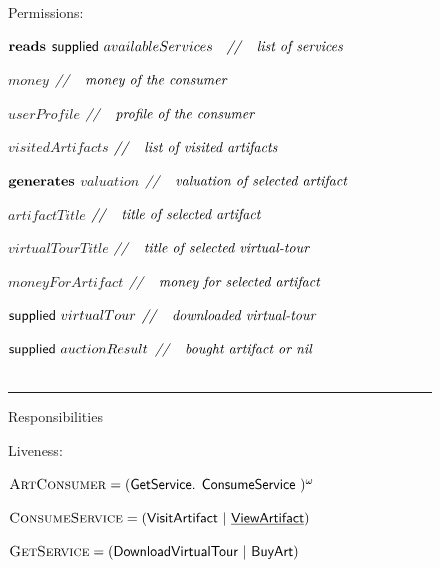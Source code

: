 \documentclass[paper=letter, fontsize=12pt]{article}
\begin{document}
\begin{figure}[H]
\begin{center}
{{\setlength\parindent{14pt} Permissions: 
\par\setlength\parindent{104pt}$\text{\textbf{reads}}$ \hspace{2.8em} $\text{{\fontfamily{\sfdefault}\selectfont supplied }}availableServices \quad \text{\textit{//}} \quad \text{\textit{list of services}}$
\par\setlength\parindent{162pt}$money$\hspace{8.9em} $\text{\textit{//}} \quad \text{\textit{money of the consumer}}$
\par\setlength\parindent{162pt}$userProfile$\hspace{6.6em} $\text{\textit{//}} \quad \text{\textit{profile of the consumer}}$
\par\setlength\parindent{162pt}$visitedArtifacts$\hspace{4.5em} $\text{\textit{//}} \quad \text{\textit{list of visited artifacts}}$
\par\setlength\parindent{104pt}$\text{\textbf{generates}}$ \hspace{0.9em} $valuation$\hspace{7.5em} $\text{\textit{//}} \quad \text{\textit{valuation of selected artifact}}$
\par\setlength\parindent{162pt}$artifactTitle$\hspace{6.1em} $\text{\textit{//}} \quad \text{\textit{title of selected artifact}}$\
\par\setlength\parindent{162pt}$virtualTourTitle$\hspace{4.4em} $\text{\textit{//}} \quad \text{\textit{title of selected virtual-tour}}$\
\par\setlength\parindent{162pt}$moneyForArtifact$\hspace{3.4em} $\text{\textit{//}} \quad \text{\textit{money for selected artifact}}$
\par\setlength\parindent{162pt}$\text{{\fontfamily{\sfdefault}\selectfont supplied }}virtualTour$\hspace{2.5em} $\text{\textit{//}} \quad \text{\textit{downloaded virtual-tour}}$
\par\setlength\parindent{162pt}$\text{{\fontfamily{\sfdefault}\selectfont supplied }}auctionResult$\hspace{1.4em} $\text{\textit{//}} \quad \text{\textit{bought artifact or nil}}$
\\
\\
\setlength\parindent{14pt} \noindent\rule{15cm}{0.4pt}

\setlength\parindent{14pt} Responsibilities
\par \setlength\parindent{14pt} Liveness:
\par\setlength\parindent{75pt}$\text{\textsc{ArtConsumer}} = (\text{{\fontfamily{\sfdefault}\selectfont 
GetService. ConsumeService
}})^{\omega}$
\par\setlength\parindent{75pt}$\text{\textsc{ConsumeService}} = (\text{{\fontfamily{\sfdefault}\selectfont 
VisitArtifact | \underline{ViewArtifact}}})$
\par\setlength\parindent{75pt}$\text{\textsc{GetService}} = (\text{{\fontfamily{\sfdefault}\selectfont 
DownloadVirtualTour |  BuyArt}})$

}}
\end{center}
\end{figure}
\end{document}
